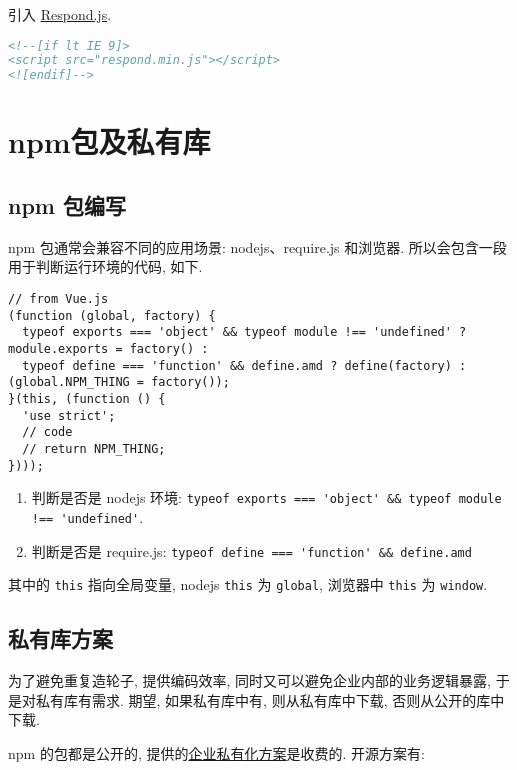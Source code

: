 引入 \href{https://github.com/scottjehl/Respond}{Respond.js}.

\begin{lstlisting}[language=HTML]
<!--[if lt IE 9]>
<script src="respond.min.js"></script>
<![endif]-->
\end{lstlisting}

\section{npm包及私有库}\label{npmux5305ux53caux79c1ux6709ux5e93}

\subsection{npm 包编写}\label{npm-ux5305ux7f16ux5199}

npm 包通常会兼容不同的应用场景: nodejs、require.js 和浏览器.
所以会包含一段用于判断运行环境的代码, 如下.

\begin{lstlisting}
// from Vue.js
(function (global, factory) {
  typeof exports === 'object' && typeof module !== 'undefined' ? module.exports = factory() :
  typeof define === 'function' && define.amd ? define(factory) : (global.NPM_THING = factory());
}(this, (function () {
  'use strict';
  // code
  // return NPM_THING;
})));
\end{lstlisting}

\begin{enumerate}
\def\labelenumi{\arabic{enumi}.}
\tightlist
\item
  判断是否是 nodejs 环境:
  \lstinline"typeof exports === 'object' && typeof module !== 'undefined'".
\item
  判断是否是 require.js:
  \lstinline!typeof define === 'function' && define.amd!
\end{enumerate}

其中的 \lstinline!this! 指向全局变量, nodejs \lstinline!this! 为
\lstinline!global!, 浏览器中 \lstinline!this! 为 \lstinline!window!.

\subsection{私有库方案}\label{ux79c1ux6709ux5e93ux65b9ux6848}

为了避免重复造轮子, 提供编码效率, 同时又可以避免企业内部的业务逻辑暴露,
于是对私有库有需求. 期望, 如果私有库中有, 则从私有库中下载,
否则从公开的库中下载.

npm 的包都是公开的,
提供的\href{https://www.npmjs.com/enterprise}{企业私有化方案}是收费的.
开源方案有:

